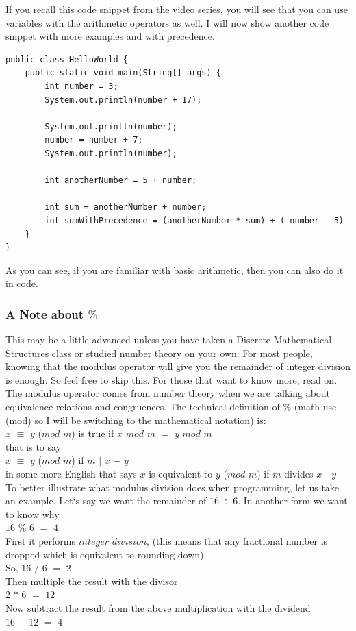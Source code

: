 \documentclass[11]{article}
\begin{document}
If you recall this code snippet from the video series, you will see that you can use variables with the arithmetic operators as well. I will now show another code snippet with more examples and with precedence.

\begin{lstlisting}
public class HelloWorld {
    public static void main(String[] args) {
        int number = 3;
        System.out.println(number + 17);

        System.out.println(number);
        number = number + 7;
        System.out.println(number);
        
        int anotherNumber = 5 + number;
        
        int sum = anotherNumber + number;
        int sumWithPrecedence = (anotherNumber * sum) + ( number - 5)
    }
}

\end{lstlisting}
As you can see, if you are familiar with basic arithmetic, then you can also do it in code.

\subsubsection{A Note about $\%$}
This may be a little advanced unless you have taken a Discrete Mathematical Structures class or studied number theory on your own. For most people, knowing that the modulus operator will give you the remainder of integer division is enough. So feel free to skip this. For those that want to know more, read on.\\

The modulus operator comes from number theory when we are talking about equivalence relations and congruences. The technical definition of $\%$ (math use (mod) so I will be switching to the mathematical notation) is:\\
$x$ $\equiv$ $y$ ($mod$ $m$) is true if $x$ $mod$ $m$ $=$ $y$ $mod$ $m$\\
that is to say\\
$x$ $\equiv$ $y$ ($mod$ $m$) if $m$ $|$ $x$ $-$ $y$\\

in some more English that says $x$ is equivalent to $y$ ($mod$ $m$) if $m$ divides $x$ - $y$\\
To better illustrate what modulus division does when programming, let us take an example. Let`s say we want the remainder of $16$ $\div$ $6$. In another form we want to know why \\
$16$ $\%$ $6$ $=$ $4$\\
First it performs $integer$ $division$, (this means that any fractional number is dropped which is equivalent to rounding down)\\
So, $16$ $/$ $6$ $=$ $2$\\
Then multiple the result with the divisor\\
$2$ $*$ $6$ $=$ $12$\\
Now subtract the result from the above multiplication with the dividend\\
$16$ $-$ $12$ $=$ $4$\\
\end{document}
